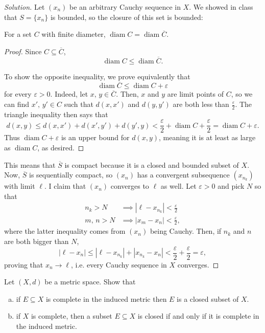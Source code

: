 \documentclass[11pt]{scrartcl}
\providecommand{\ol}{\overline}
\providecommand{\eps}{\varepsilon}
\providecommand{\ii}{\item}
\newenvironment{soln}{\begin{proof}[Solution]}{\end{proof}}
\begin{document}
\begin{soln}
	Let $(x_n)$ be an arbitrary Cauchy sequence in $X$.
	We showed in class that $S = \{x_n\}$ is bounded,
	so the closure of this set is bounded:
	\begin{claim}
		For a set $C$ with finite diameter,
		$\operatorname{diam}C = \operatorname{diam}\ol C$.
	\end{claim}
	\begin{proof}
		Since $C\subseteq\ol C$,
		\[\operatorname{diam} C \le \operatorname{diam}\ol C.\]
		
		To show the opposite inequality, we prove equivalently that
		\[\operatorname{diam}\ol C \le \operatorname{diam} C + \eps\]
		for every $\eps > 0$.
		Indeed, let $x,\,y\in\ol C$. Then, $x$ and $y$ are limit points of $C$,
		so we can find $x',\,y'\in C$ such that
		$d(x,x')$ and $d(y, y')$ are both less than $\frac\eps 2$.
		The triangle inequality then says that
		\[d(x, y) \le d(x, x') + d(x', y') + d(y', y)
		< \frac\eps 2 + \operatorname{diam}C + \frac\eps2
		= \operatorname{diam} C + \eps.\]
		Thus $\operatorname{diam} C + \eps$ is an upper bound
		for $d(x, y)$, meaning it is at least as large as
		$\operatorname{diam} C$, as desired.
	\end{proof}
	
	This means that $\ol S$ is compact because it is a closed and bounded
	subset of $X$.
	Now, $\ol S$ is sequentially compact, so
	$(x_n)$ has a convergent subsequence $(x_{n_k})$ with limit $\ell$.
	I claim that $(x_n)$ converges to $\ell$ as well.
	Let $\eps > 0$ and pick $N$ so that
	\begin{align*}
		n_k > N &\implies |\ell - x_{n_k}| < \frac\eps2\\
		m,\,n > N &\implies |x_m - x_n| < \frac\eps2,
	\end{align*}
	where the latter inequality comes from $(x_n)$ being Cauchy.
	Then, if $n_k$ and $n$ are both bigger than $N$,
	\[|\ell - x_n| \le |\ell - x_{n_k}| + |x_{n_k} - x_n|
	< \frac\eps2 + \frac\eps2 = \eps,\]
	proving that $x_n\to\ell$, i.e. every Cauchy sequence in $X$ converges.
\end{soln}

\begin{problem}
	Let $(X, d)$ be a metric space. Show that
	\begin{enumerate}[(a)]
		\ii if $E\subseteq X$ is complete in the induced metric then
		$E$ is a closed subset of $X$.
		\ii if $X$ is complete, then a subset $E\subseteq X$ is closed
		if and only if it is complete in the induced metric.
	\end{enumerate}
\end{problem}
\end{document}
